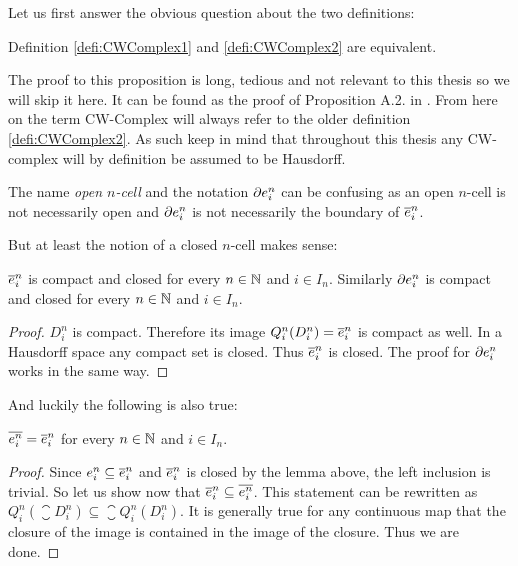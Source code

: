 Let us first answer the obvious question about the two definitions:

\begin{prop}
    Definition \ref{defi:CWComplex1} and \ref{defi:CWComplex2} are equivalent.
\end{prop}

The proof to this proposition is long, tedious and not relevant to this thesis so we will skip it here.
It can be found as the proof of Proposition A.2. in \cite{Hatcher2001}.
From here on the term CW-Complex will always refer to the older definition \ref{defi:CWComplex2}.
As such keep in mind that throughout this thesis any CW-complex will by definition be assumed to be Hausdorff.

\begin{rem}
    The name \emph{open $n$-cell} and the notation $\cellFrontier{n}{i}$ can be confusing as an open $n$-cell is not necessarily open and $\cellFrontier{n}{i}$  is not necessarily the boundary of $\closedCell{n}{i}$.
\end{rem}

But at least the notion of a closed $n$-cell makes sense:

\begin{lem}\label{lem:closedCellclosed}
    $\closedCell{n}{i}$ is compact and closed for every $n \in \bN$ and $i \in I_n$.
    Similarly $\cellFrontier{n}{i}$ is compact and closed for every $n \in \bN$ and $i \in I_n$.
\end{lem}
\begin{proof}
    $D_i^n$ is compact.
    Therefore its image $Q_i^n(D_i^n) = \closedCell{n}{i}$ is compact as well.
    In a Hausdorff space any compact set is closed.
    Thus $\closedCell{n}{i}$ is closed.
    The proof for $\cellFrontier{n}{i}$ works in the same way.
\end{proof}

And luckily the following is also true:

\begin{lem}\label{lem:closureopencell}
    $\closure{\openCell{n}{i}} = \closedCell{n}{i}$ for every $n \in \bN$ and $i \in I_n$.
\end{lem}
\begin{proof}
    Since $\openCell{n}{i} \subseteq \closedCell{n}{i}$ and $\closedCell{n}{i}$ is closed by the lemma above, the left inclusion is trivial.
    So let us show now that $\closedCell{n}{i} \subseteq \closure{\openCell{n}{i}}$.
    This statement can be rewritten as $Q_i^n \left ( \closure{D_i^n} \right ) \subseteq \closure{Q_i^n(D_i^n)}$.
    It is generally true for any continuous map that the closure of the image is contained in the image of the closure.
    Thus we are done.
\end{proof}

